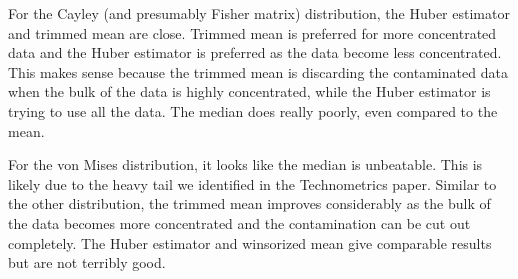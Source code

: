 \documentclass{article}\usepackage[]{graphicx}\usepackage[]{color}
\begin{document}
For the Cayley (and presumably Fisher matrix) distribution, the Huber estimator and trimmed mean are close.  Trimmed mean is preferred for more concentrated data and the Huber estimator is preferred as the data become less concentrated.  This makes sense because the trimmed mean is discarding the contaminated data when the bulk of the data is highly concentrated, while the Huber estimator is trying to use all the data.  The median does really poorly, even compared to the mean.

For the von Mises distribution, it looks like the median is unbeatable.  This is likely due to the heavy tail we identified in the Technometrics paper.  Similar to the other distribution, the trimmed mean improves considerably as the bulk of the data becomes more concentrated and the contamination can be cut out completely.  The Huber estimator and winsorized mean give comparable results but are not terribly good.




\clearpage
%

\end{document}
